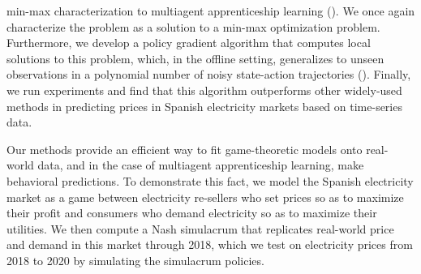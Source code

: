 min-max characterization to multiagent apprenticeship learning ().
We once again characterize the problem as a solution to a min-max optimization problem.
Furthermore, we develop a policy gradient algorithm that computes local solutions to this problem, which, in the offline setting, generalizes to unseen observations in a polynomial number of noisy state-action trajectories ().
Finally, we run experiments and find that this algorithm outperforms other widely-used 
methods  in predicting prices in Spanish electricity markets based on time-series data.


Our methods provide an efficient way to fit game-theoretic models onto real-world data, and in the case of multiagent apprenticeship learning, make behavioral predictions. 
To demonstrate this fact, we model the Spanish electricity market as a game between electricity re-sellers who set prices so as to maximize their profit and consumers who demand electricity so as to maximize their utilities.
We then compute a Nash simulacrum that replicates real-world price and demand in this market through 2018, which we test on electricity prices from 2018 to 2020 by simulating the simulacrum policies.
\fi





